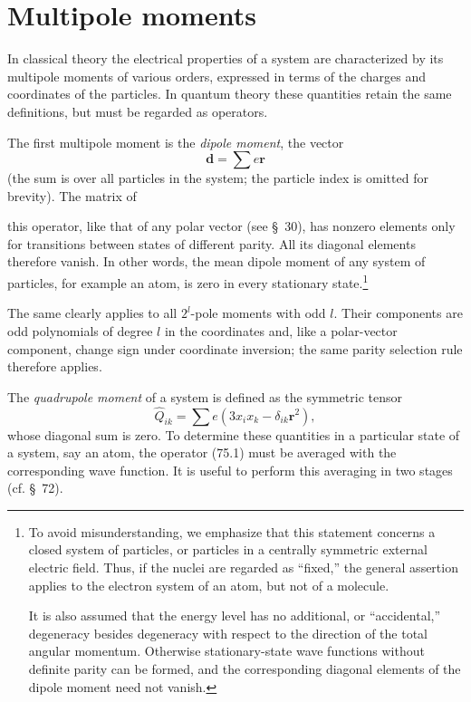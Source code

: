 \section{Multipole moments}

In classical theory the electrical properties of a system are characterized by its multipole moments of various orders, expressed in terms of the charges and coordinates of the particles. In quantum theory these quantities retain the same definitions, but must be regarded as operators.

The first multipole moment is the \emph{dipole moment}, the vector
\[\mathbf d=\sum e\mathbf r\]
(the sum is over all particles in the system; the particle index is omitted for brevity). The matrix of

this operator, like that of any polar vector (see \S~30), has nonzero elements only for transitions between states of different parity. All its diagonal elements therefore vanish. In other words, the mean dipole moment of any system of particles, for example an atom, is zero in every stationary state.\footnote{To avoid misunderstanding, we emphasize that this statement concerns a closed system of particles, or particles in a centrally symmetric external electric field. Thus, if the nuclei are regarded as ``fixed,'' the general assertion applies to the electron system of an atom, but not of a molecule.

It is also assumed that the energy level has no additional, or ``accidental,'' degeneracy besides degeneracy with respect to the direction of the total angular momentum. Otherwise stationary-state wave functions without definite parity can be formed, and the corresponding diagonal elements of the dipole moment need not vanish.}

The same clearly applies to all $2^l$-pole moments with odd $l$. Their components are odd polynomials of degree $l$ in the coordinates and, like a polar-vector component, change sign under coordinate inversion; the same parity selection rule therefore applies.

The \emph{quadrupole moment} of a system is defined as the symmetric tensor
\begin{equation}\widehat Q_{ik}=\sum e(3x_ix_k-\delta_{ik}\mathbf r^2),\tag{75.1}\end{equation}
whose diagonal sum is zero. To determine these quantities in a particular state of a system, say an atom, the operator (75.1) must be averaged with the corresponding wave function. It is useful to perform this averaging in two stages (cf. \S~72).

